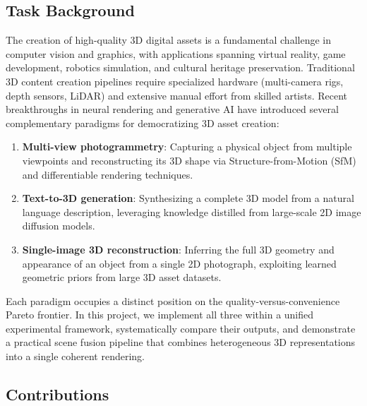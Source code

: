 \documentclass{article}
\begin{document}
\subsection{Task Background}

The creation of high-quality 3D digital assets is a fundamental challenge in computer
vision and graphics, with applications spanning virtual reality, game development,
robotics simulation, and cultural heritage preservation. Traditional 3D content
creation pipelines require specialized hardware (multi-camera rigs, depth sensors,
LiDAR) and extensive manual effort from skilled artists. Recent breakthroughs in
neural rendering and generative AI have introduced several complementary paradigms
for democratizing 3D asset creation:

\begin{enumerate}[label=(\arabic*), leftmargin=*]
    \item \textbf{Multi-view photogrammetry}: Capturing a physical object from
    multiple viewpoints and reconstructing its 3D shape via Structure-from-Motion
    (SfM) and differentiable rendering techniques.

    \item \textbf{Text-to-3D generation}: Synthesizing a complete 3D model from
    a natural language description, leveraging knowledge distilled from large-scale
    2D image diffusion models.

    \item \textbf{Single-image 3D reconstruction}: Inferring the full 3D geometry
    and appearance of an object from a single 2D photograph, exploiting learned
    geometric priors from large 3D asset datasets.
\end{enumerate}

Each paradigm occupies a distinct position on the quality-versus-convenience
Pareto frontier. In this project, we implement all three within a unified
experimental framework, systematically compare their outputs, and demonstrate
a practical scene fusion pipeline that combines heterogeneous 3D representations
into a single coherent rendering.

\subsection{Contributions}
\end{document}
